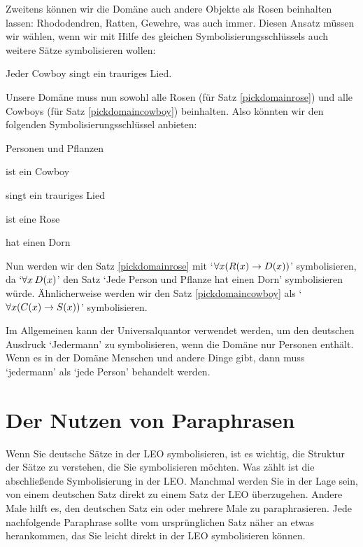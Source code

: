 Zweitens können wir die Domäne auch andere Objekte als Rosen beinhalten lassen: Rhododendren, Ratten, Gewehre, was auch immer. Diesen Ansatz müssen wir wählen, wenn wir mit Hilfe des gleichen Symbolisierungsschlüssels auch weitere Sätze symbolisieren wollen:
	\begin{earg}
		\item[\ex{pickdomaincowboy}] Jeder Cowboy singt ein trauriges Lied.
	\end{earg}
Unsere Domäne muss nun sowohl alle Rosen (für Satz \ref{pickdomainrose}) und alle Cowboys (für Satz \ref{pickdomaincowboy}) beinhalten. Also könnten wir den folgenden Symbolisierungsschlüssel anbieten:
	\begin{ekey}
		\item[\text{Domäne}] Personen und Pflanzen
		\item[\atom{C}{x}]  ist ein Cowboy
		\item[\atom{S}{x}]  singt ein trauriges Lied
		\item[\atom{R}{x}]  ist eine Rose
		\item[\atom{D}{x}]  hat einen Dorn %
	\end{ekey}
Nun werden wir den Satz \ref{pickdomainrose} mit `$\forall x (\mathord{R}(x) \rightarrow \mathord{D}(x))$' symbolisieren, da `$\forall x\, \mathord{D}(x)$' den Satz `Jede Person und Pflanze hat einen Dorn' symbolisieren würde. Ähnlicherweise werden wir den Satz \ref{pickdomaincowboy} als `$\forall x (\mathord{C}(x) \rightarrow \mathord{S}(x))$' symbolisieren. 

Im Allgemeinen kann der Universalquantor verwendet werden, um den deutschen Ausdruck `Jedermann' zu symbolisieren, wenn die Domäne nur Personen enthält. Wenn es in der Domäne Menschen und andere Dinge gibt, dann muss `jedermann' als `jede Person' behandelt werden.


\section{Der Nutzen von Paraphrasen}
Wenn Sie deutsche Sätze in der LEO symbolisieren, ist es wichtig, die Struktur der Sätze zu verstehen, die Sie symbolisieren möchten. Was zählt ist die abschlie{\ss}ende Symbolisierung in der LEO. Manchmal werden Sie in der Lage sein, von einem deutschen Satz direkt zu einem Satz der LEO überzugehen. Andere Male hilft es, den deutschen Satz ein oder mehrere Male zu paraphrasieren. Jede nachfolgende Paraphrase sollte vom ursprünglichen Satz näher an etwas herankommen, das Sie leicht direkt in der LEO symbolisieren können.

